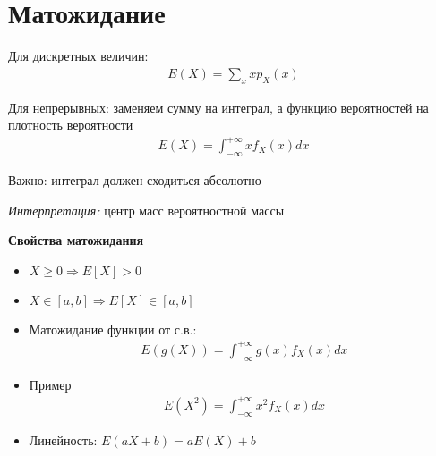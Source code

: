\documentclass[12pt]{article}
\begin{document}
  \begin{center}
  \end{center}

  \section{Матожидание}

  Для дискретных величин:
  \begin{align*}
      E(X) = \sum_x x p_X(x)
  \end{align*}

  Для непрерывных: заменяем сумму на интеграл, а функцию вероятностей на плотность вероятности
  \begin{align*}
      E(X) = \int_{-\infty}^{+\infty} x f_X(x) dx
  \end{align*}

  Важно: интеграл должен сходиться абсолютно

  \emph{Интерпретация:} центр масс вероятностной массы

  \textbf{Свойства матожидания}

  \begin{itemize}
    \item $X \ge 0 \Rightarrow E[X] > 0$
    \item $X \in [a, b] \Rightarrow E[X] \in [a, b]$
    \item Матожидание функции от с.в.:
    \begin{align*}
        E(g(X)) = \int_{-\infty}^{+\infty} g(x) f_X(x) dx
    \end{align*}
    \item Пример
    \begin{align*}
        E(X^2) = \int_{-\infty}^{+\infty} x^2 f_X(x) dx
    \end{align*}
    \item Линейность: $E(aX + b) = aE(X) + b$
  \end{itemize}
\end{document}
